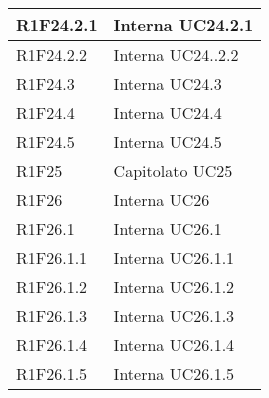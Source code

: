 \begin{center}
\begin{longtable}{|p{22mm}|p{44mm}|}
R1F24.2.1 &
Interna \newline
UC24.2.1 \newline
\\
\hline

R1F24.2.2 &
Interna \newline
UC24..2.2 \newline
\\
\hline

R1F24.3 &
Interna \newline
UC24.3 \newline
\\
\hline

R1F24.4 &
Interna \newline
UC24.4 \newline
\\
\hline

R1F24.5 &
Interna \newline
UC24.5 \newline
\\
\hline

R1F25 &
Capitolato \newline
UC25 \newline
\\
\hline

R1F26 &
Interna \newline
UC26 \newline
\\
\hline

R1F26.1 &
Interna \newline
UC26.1 \newline
\\
\hline

R1F26.1.1 &
Interna \newline
UC26.1.1 \newline
\\
\hline

R1F26.1.2 &
Interna \newline
UC26.1.2 \newline
\\
\hline

R1F26.1.3 &
Interna \newline
UC26.1.3 \newline
\\
\hline

R1F26.1.4 &
Interna \newline
UC26.1.4 \newline
\\
\hline

R1F26.1.5 &
Interna \newline
UC26.1.5 \newline
\\
\hline


\end{longtable}
\end{center}
